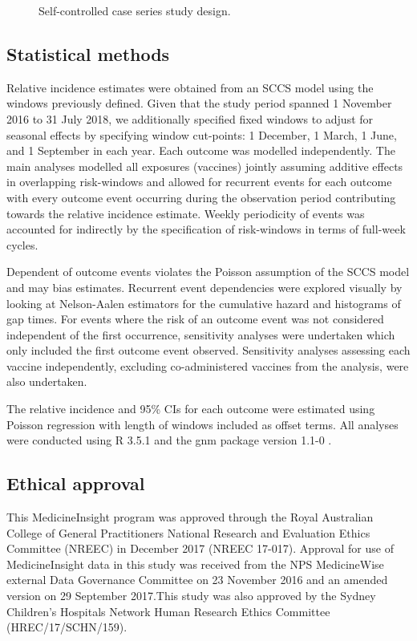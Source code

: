 \documentclass[review, endfloat]{elsarticle}
\begin{document}
\begin{figure}
\caption{Self-controlled case series study design.}
\label{fig:sccs_design}
\end{figure}

\subsection{Statistical methods}

Relative incidence estimates were obtained from an SCCS model \citep{farrington2018} using the windows previously defined. Given that the study period spanned 1 November 2016 to 31 July 2018, we additionally specified fixed windows to adjust for seasonal effects by specifying window cut-points: 1 December, 1 March, 1 June, and 1 September in each year. Each outcome was modelled independently. The main analyses modelled all exposures (vaccines) jointly assuming additive effects in overlapping risk-windows and allowed for recurrent events for each outcome with every outcome event occurring during the observation period contributing towards the relative incidence estimate. Weekly periodicity of events was accounted for indirectly by the specification of risk-windows in terms of full-week cycles.

Dependent of outcome events violates the Poisson assumption of the SCCS model and may bias estimates. Recurrent event dependencies were explored visually by looking at Nelson-Aalen estimators for the cumulative hazard and histograms of gap times. For events where the risk of an outcome event was not considered independent of the first occurrence, sensitivity analyses were undertaken which only included the first outcome event observed.  Sensitivity analyses assessing each vaccine independently, excluding co-administered vaccines from the analysis, were also undertaken. 

The relative incidence and 95\% CIs for each outcome were estimated using Poisson regression with length of windows included as offset terms. All analyses were conducted using R 3.5.1 \citep{rmanual} and the gnm package version 1.1-0 \citep{rgnm}.

\subsection{Ethical approval}

This MedicineInsight program was approved through the Royal Australian College of General Practitioners National Research and Evaluation Ethics Committee (NREEC) in December 2017 (NREEC 17-017). Approval for use of MedicineInsight data in this study was received from the NPS MedicineWise external Data Governance Committee on 23 November 2016 and an amended version on 29 September 2017.This study was also approved by the Sydney Children’s Hospitals Network Human Research Ethics Committee (HREC/17/SCHN/159). 
\end{document}
